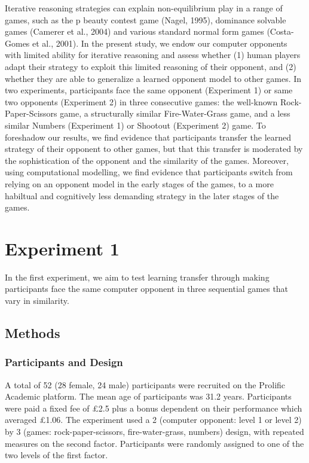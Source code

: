 \documentclass[man,floatsintext]{apa6}
\begin{document}
Iterative reasoning strategies can explain non-equilibrium play in a range of games, such as the p beauty contest game (Nagel, 1995), dominance solvable games (Camerer et al., 2004) and various standard normal form games (Costa-Gomes et al., 2001). In the present study, we endow our computer opponents with limited ability for iterative reasoning and assess whether (1) human players adapt their strategy to exploit this limited reasoning of their opponent, and (2) whether they are able to generalize a learned opponent model to other games. In two experiments, participants face the same opponent (Experiment 1) or same two opponents (Experiment 2) in three consecutive games: the well-known Rock-Paper-Scissors game, a structurally similar Fire-Water-Grass game, and a less similar Numbers (Experiment 1) or Shootout (Experiment 2) game. To foreshadow our results, we find evidence that participants transfer the learned strategy of their opponent to other games, but that this transfer is moderated by the sophistication of the opponent and the similarity of the games. Moreover, using computational modelling, we find evidence that participants switch from relying on an opponent model in the early stages of the games, to a more habiltual and cognitively less demanding strategy in the later stages of the games.

\hypertarget{experiment-1}{%
\section{Experiment 1}\label{experiment-1}}

In the first experiment, we aim to test learning transfer through making participants face the same computer opponent in three sequential games that vary in similarity.

\hypertarget{methods}{%
\subsection{Methods}\label{methods}}

\hypertarget{participants-and-design}{%
\subsubsection{Participants and Design}\label{participants-and-design}}

A total of 52 (28 female, 24 male) participants were recruited on the Prolific Academic platform. The mean age of participants was 31.2 years. Participants were paid a fixed fee of £2.5 plus a bonus dependent on their performance which averaged £1.06. The experiment used a 2 (computer opponent: level 1 or level 2) by 3 (games: rock-paper-scissors, fire-water-grass, numbers) design, with repeated measures on the second factor. Participants were randomly assigned to one of the two levels of the first factor.
\end{document}
